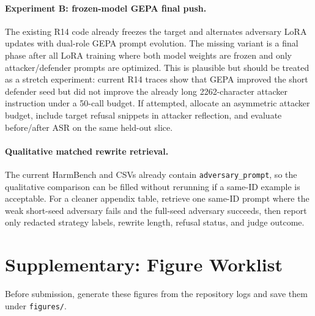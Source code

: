 \paragraph{Experiment B: frozen-model GEPA final push.}
The existing R14 code already freezes the target and alternates adversary LoRA updates with dual-role GEPA prompt evolution. 
The missing variant is a final phase after all LoRA training where both model weights are frozen and only attacker/defender prompts are optimized. 
This is plausible but should be treated as a stretch experiment: current R14 traces show that GEPA improved the short defender seed but did not improve the already long 2262-character attacker instruction under a 50-call budget. 
If attempted, allocate an asymmetric attacker budget, include target refusal snippets in attacker reflection, and evaluate before/after ASR on the same held-out \harmbench{} slice.

\paragraph{Qualitative matched rewrite retrieval.}
The current HarmBench and \xstest{} CSVs already contain \texttt{adversary\_prompt}, so the qualitative comparison can be filled without rerunning if a same-ID example is acceptable. 
For a cleaner appendix table, retrieve one same-ID prompt where the weak short-seed adversary fails and the full-seed adversary succeeds, then report only redacted strategy labels, rewrite length, refusal status, and judge outcome.

\section{Supplementary: Figure Worklist}

Before submission, generate these figures from the repository logs and save them under \texttt{figures/}.

